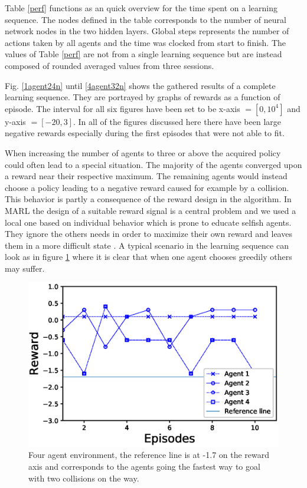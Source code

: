 \documentclass[journal,twoside]{IEEEtran}
\begin{document}
Table \ref{perf} functions as an quick overview for the time spent on a learning sequence. The nodes defined in the table corresponds to the number of neural network nodes in the two hidden layers. Global steps represents the number of actions taken by all agents and the time was clocked from start to finish. The values of Table \ref{perf} are not from a single learning sequence but are instead composed of rounded averaged values from three sessions. \par
Fig. \ref{1agent24n} until \ref{4agent32n} shows the gathered results of a complete learning sequence. They are portrayed by graphs of rewards as a function of episode. The interval for all six figures have been set to be x-axis $ = [0, 10^{4}] $ and y-axis $ = [-20, 3] $. In all of the figures discussed here there have been large negative rewards especially during the first episodes that were not able to fit. \par
When increasing the number of agents to three or above the acquired policy could often lead to a special situation. The majority of the agents converged upon a reward near their respective maximum. The remaining agents would instead choose a policy leading to a negative reward caused for example by a collision. This behavior is partly a consequence of the reward design in the algorithm. In MARL the  design of a suitable reward signal is a central problem and we used a local one based on individual behavior which is prone to educate selfish agents. They ignore the others needs in order to maximize their own reward and leaves them in a more difficult state \cite{Reward}. A typical scenario in the learning sequence can look as in figure \ref{selfish} where it is clear that when one agent chooses greedily others may suffer.
\begin{figure}[!h]
	\centering
	\includegraphics[width=\columnwidth]{selfish}
	\caption{Four agent environment, the reference line is at -1.7 on the reward axis and corresponds to the agents going the fastest way to goal with two collisions on the way.}
	\label{selfish}    
\end{figure}
\end{document}
